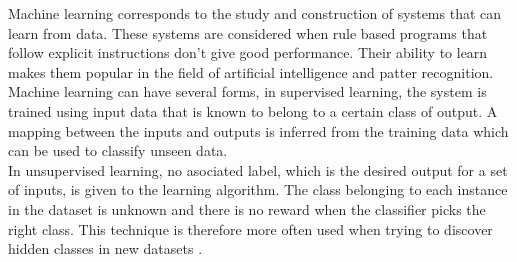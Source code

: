 Machine learning corresponds to the study and construction of systems that can learn from data. These systems are considered when rule based programs that follow explicit instructions don't give good performance. Their ability to learn makes them popular in the field of artificial intelligence and patter recognition. Machine learning can have several forms, in supervised learning, the system is trained using input data that is known to belong to a certain class of output. A mapping between the inputs and outputs is inferred from the training data which can be used to classify unseen data.\cite{cord2008machine}\\
In unsupervised learning, no asociated label, which is the desired output for a set of inputs, is given to the learning algorithm. The class belonging to each instance in the dataset is unknown and there is no reward when the classifier picks the right class. This technique is therefore more often used when trying to discover hidden classes in new datasets \cite{maglogiannis2007emerging}.\\






